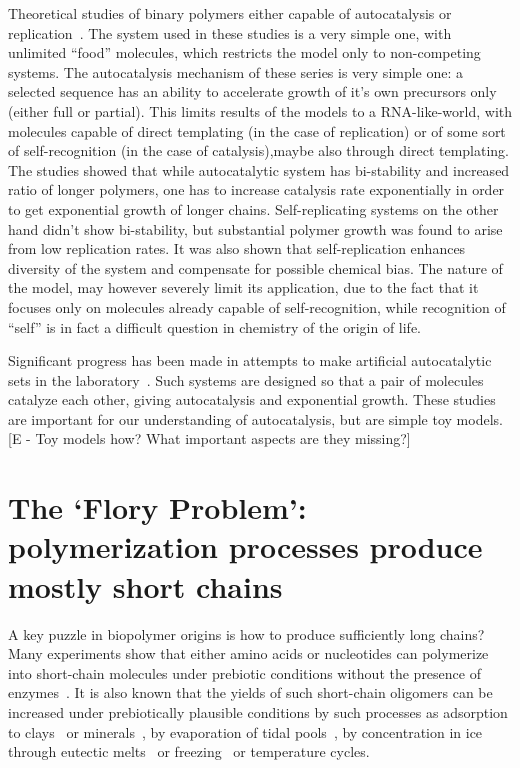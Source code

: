 \documentclass[journal=jacsat,manuscript=article,layout=twocolumn]{achemso}
\begin{document}
Theoretical studies of binary polymers either 
capable of autocatalysis or 
replication~\cite{nowak2008prevolutionary,Ohtsuki2009,Chen2012,Derr2012}. The system used in these 
studies is a very simple one, with unlimited ``food'' molecules, which restricts the model only to 
non-competing systems. The autocatalysis mechanism of these series is very simple one: a selected 
sequence has an ability to accelerate growth of it's own precursors only (either full or partial). 
This limits results of the models to a RNA-like-world, with molecules capable of direct templating 
(in the case of replication) or of some sort of self-recognition (in the case of catalysis),maybe 
also through direct templating.
The studies  showed that while autocatalytic system has bi-stability and increased ratio of longer 
polymers, one has to increase catalysis rate exponentially in order to get exponential growth of 
longer chains. Self-replicating systems on the other hand didn't show bi-stability, but substantial 
polymer growth was found to arise from low replication rates. It was also shown that 
self-replication enhances diversity of the system and compensate for possible chemical bias. The 
nature of the model, may however severely limit its application, due to the fact that it 
focuses only on molecules already capable of self-recognition, while recognition of ``self'' is in 
fact a difficult question in chemistry of the origin of life.

 
 Significant progress has been made in attempts to make artificial autocatalytic sets in the  
 laboratory~\cite{VonKiedrowski1986,Lincoln2009,Vaidya2012}. Such systems are designed so that a 
pair of molecules catalyze each other, giving autocatalysis and exponential growth. These studies 
are important for our understanding of autocatalysis, but are simple toy models. [E - Toy models 
how?  What important aspects are they missing?]
 
 
 \section{The `Flory Problem': polymerization processes produce mostly short chains}
 \label{sec:flory} 

A key puzzle in biopolymer origins is how to produce sufficiently long chains?  Many experiments 
show that either amino acids or nucleotides can polymerize into short-chain molecules under 
prebiotic conditions without the presence of 
enzymes~\cite{Shock1992,Martin1998,PAECHT-HOROWITZ1970,Leman2004a,Orgel2004}.  It is also known that 
the yields of such short-chain oligomers can be increased under prebiotically plausible conditions 
by such processes as adsorption to clays~\cite{Rao1980,Lambert2008} or 
minerals~\cite{Bernal1949,Ferris1996}, by evaporation of tidal pools~\cite{Nelson2001}, by 
concentration in ice through eutectic melts~\cite{Kanavarioti2001} or freezing~\cite{Bada2004} or 
temperature cycles. 
\end{document}
